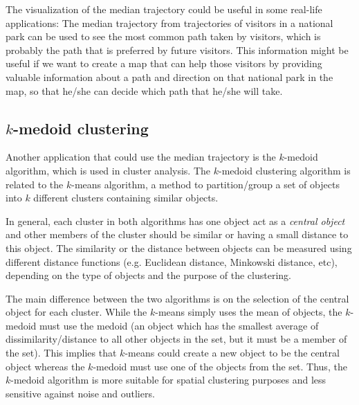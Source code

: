 The visualization of the median trajectory could be useful in some real-life applications:
The median trajectory from trajectories of visitors in a national park can be used to see the most common path taken by visitors, which is probably the path that is preferred by future visitors.
This information might be useful if we want to create a map that can help those visitors by providing valuable information about a path and direction on that national park in the map, so that he/she can decide which path that he/she will take. 

\subsection{\texorpdfstring{$k$}{k}-medoid clustering}
Another application that could use the median trajectory is the $k$-medoid algorithm, which is used in cluster analysis.
The $k$-medoid clustering algorithm is related to the $k$-means algorithm, a method to partition/group a set of objects into $k$ different clusters containing similar objects.

In general, each cluster in both algorithms has one object act as a \textit{central object} and other members of the cluster should be similar or having a small distance to this object.
The similarity or the distance between objects can be measured using different distance functions (e.g. Euclidean distance, Minkowski distance, etc), depending on the type of objects and the purpose of the clustering.

The main difference between the two algorithms is on the selection of the central object for each cluster. 
While the $k$-means simply uses the mean of objects, the $k$-medoid must use the medoid (an object which has the smallest average of dissimilarity/distance to all other objects in the set, but it must be a member of the set). 
This implies that $k$-means could create a new object to be the central object whereas the $k$-medoid must use one of the objects from the set.
Thus, the $k$-medoid algorithm is more suitable for spatial clustering purposes and less sensitive against noise and outliers.  


